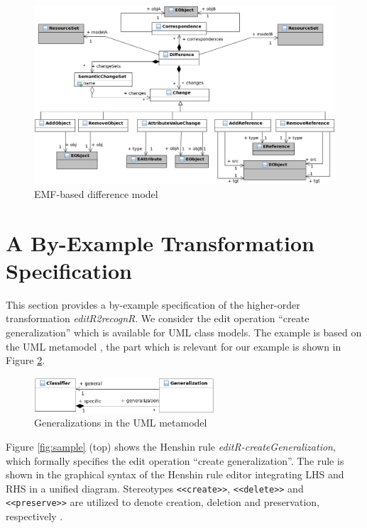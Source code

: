 \documentclass{llncs}
\begin{document}
\begin{figure}[htb]
  \centering
  \includegraphics[width=1.0\textwidth]{pic/diffmodel.png}
  \caption{EMF-based difference model}
  \label{fig:diffmodel}
\end{figure}




\section{A By-Example Transformation Specification}
\label{sec:specification}

This section provides a by-example specification of the higher-order transformation \textit{editR2recognR}.
We consider the edit operation ``create generalization'' which
is available for UML class models.
The example is based on the UML metamodel \cite{Superstructure}, 
the part which is relevant for our example is shown in 
Figure \ref{fig:uml-metamodell}.

\begin{figure}[h!]
    \centering
    \includegraphics[width=0.6\textwidth]{pic/uml-metamodel.png}
    \caption{Generalizations in the UML metamodel}
    \label{fig:uml-metamodell}
\end{figure}

Figure \ref{fig:sample} (top) shows the Henshin rule
\textit{editR-createGeneralization}, which formally specifies the edit
operation ``create generalization''.
The rule is shown in the graphical syntax of the
Henshin rule editor 
integrating LHS and RHS in a unified diagram. Stereotypes
\texttt{<<create>>}, \texttt{<<delete>>} and \texttt{<<preserve>>} 
are utilized to denote creation, deletion and preservation, 
respectively \cite{JuT2011TTC}.
\end{document}
